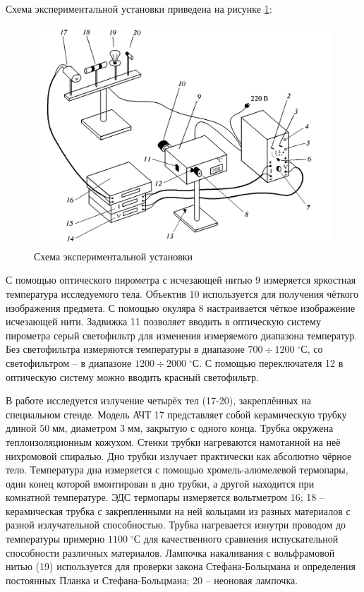 \documentclass[a4paper, 12pt]{article}
\newcommand{\mm}{\; мм}
\newcommand{\cels}{\; ^\circ С}
\begin{document}
    Схема экспериментальной установки приведена на рисунке \ref{img:exp_scheme}:
    \begin{figure}[H]
        \centering
        \includegraphics[width=1\textwidth]{images/exp_scheme.png}
        \caption{Схема экспериментальной установки}
        \label{img:exp_scheme}
    \end{figure}
	
    С помощью оптического пирометра с исчезающей нитью 9 измеряется яркостная температура исследуемого тела. Объектив 10 используется для получения чёткого изображения предмета. С помощью окуляра 8 настраивается чёткое изображение исчезающей нити. Задвижка 11 позволяет вводить в оптическую систему пирометра серый светофильтр для изменения измеряемого диапазона температур. Без светофильтра измеряются температуры в диапазоне $700 \div 1200 \cels$, со светофильтром -- в диапазоне $1200 \div 2000 \cels$. С помощью переключателя 12 в оптическую систему можно вводить красный светофильтр.
	
    В работе исследуется излучение четырёх тел (17-20), закреплённых на специальном стенде. Модель АЧТ 17 представляет собой керамическую трубку длиной $50 \mm$, диаметром $3 \mm$, закрытую с одного конца. Трубка окружена теплоизоляционным кожухом. Стенки трубки нагреваются намотанной на неё нихромовой спиралью. Дно трубки излучает практически как абсолютно чёрное тело. Температура дна измеряется с помощью хромель-алюмелевой термопары, один конец которой вмонтирован в дно трубки, а другой находится при комнатной температуре. ЭДС термопары измеряется вольтметром 16; 18 -- керамическая трубка с закрепленными на ней кольцами из разных материалов с разной излучательной способностью. Трубка нагревается изнутри проводом до температуры примерно $1100 \cels$ для качественного сравнения испускательной способности различных материалов. Лампочка накаливания с вольфрамовой нитью (19) используется для проверки закона Стефана-Больцмана и определения постоянных Планка и Стефана-Больцмана; 20 -- неоновая лампочка.
	
\end{document}
